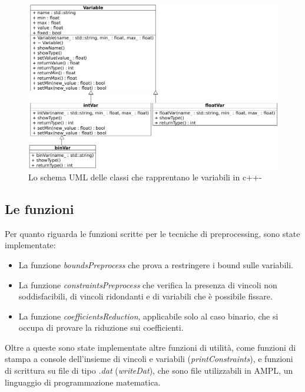 \documentclass{article}
\begin{document}
\begin{center}
\begin{figure}
\includegraphics[scale=0.38]{uml.png}
\caption{\footnotesize{Lo schema UML delle classi che rapprentano le variabili in c++-}}
\label{UML}
\end{figure}
\end{center}
\subsection{Le funzioni}
Per quanto riguarda le funzioni scritte per le tecniche di preprocessing, sono state implementate:

\begin{itemize}
\item La funzione \textit{boundsPreprocess} che prova a restringere i bound sulle variabili.
\item La funzione \textit{constraintsPreprocess} che verifica la presenza di vincoli
non soddisfacibili, di vincoli ridondanti e di variabili che è possibile fissare.
\item La funzione \textit{coefficientsReduction}, applicabile solo al caso binario, che si occupa di provare la riduzione sui coefficienti.
\end{itemize}

Oltre a queste sono state implementate altre funzioni di utilità, come funzioni di stampa a console dell'insieme di vincoli e variabili (\textit{printConstraints}), e funzioni di scrittura su file di tipo \textit{.dat} (\textit{writeDat}), che sono file utilizzabili in AMPL, un linguaggio di programmazione matematica.
\end{document}
